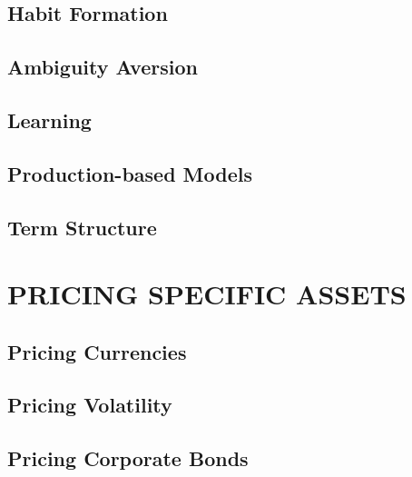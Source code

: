 \documentclass[
]{book}
\begin{document}
\hypertarget{habit-formation}{%
\chapter{Habit Formation}\label{habit-formation}}

\hypertarget{ambiguity-aversion}{%
\chapter{Ambiguity Aversion}\label{ambiguity-aversion}}

\hypertarget{learning}{%
\chapter{Learning}\label{learning}}

\hypertarget{production-based-models}{%
\chapter{Production-based Models}\label{production-based-models}}

\hypertarget{term-structure}{%
\chapter{Term Structure}\label{term-structure}}

\hypertarget{part-pricing-specific-assets}{%
\part*{PRICING SPECIFIC ASSETS}\label{part-pricing-specific-assets}}

\hypertarget{pricing-currencies}{%
\chapter{Pricing Currencies}\label{pricing-currencies}}

\hypertarget{pricing-volatility}{%
\chapter{Pricing Volatility}\label{pricing-volatility}}

\hypertarget{pricing-corporate-bonds}{%
\chapter{Pricing Corporate Bonds}\label{pricing-corporate-bonds}}
\end{document}
